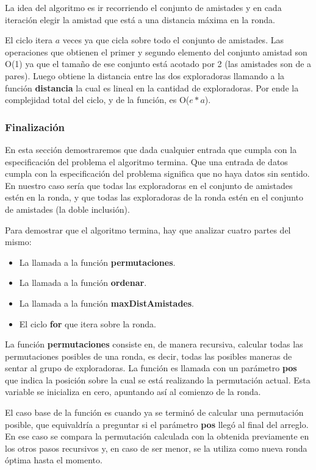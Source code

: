 \documentclass[11pt]{article}
\begin{document}
La idea del algoritmo es ir recorriendo el conjunto de amistades y en cada iteración elegir la amistad que está   
a una distancia máxima en la ronda.

El ciclo itera $a$ veces ya que cicla sobre todo el conjunto de amistades. Las operaciones que obtienen el 
primer y segundo elemento del conjunto amistad son O(1) ya que el tamaño de ese conjunto está acotado por 
2 (las amistades son de a pares). Luego obtiene la distancia entre las dos exploradoras llamando a la 
función \textbf{distancia} la cual es lineal en la cantidad de exploradoras. Por ende la complejidad
total del ciclo, y de la función, es O($e*a$). 
\subsubsection{Finalización}

En esta sección demostraremos que dada cualquier entrada que cumpla con la especificación del problema el 
algoritmo termina. Que una entrada de datos cumpla con la especificación del problema significa que no haya
datos sin sentido. En nuestro caso sería que todas las exploradoras en el conjunto de amistades estén en la  
ronda, y que todas las exploradoras de la ronda estén en el conjunto de amistades (la doble inclusión).

Para demostrar que el algoritmo termina, hay que analizar cuatro partes del mismo:
\begin{itemize}
  \item La llamada a la función \textbf{permutaciones}.
  \item La llamada a la función \textbf{ordenar}.
  \item La llamada a la función \textbf{maxDistAmistades}.
  \item El ciclo \textbf{for} que itera sobre la ronda.
\end{itemize}

La función \textbf{permutaciones} consiste en, de manera recursiva, calcular todas las permutaciones posibles 
de una ronda, es decir, todas las posibles maneras de sentar al grupo de exploradoras.
La función es llamada con un parámetro \textbf{pos} que indica la posición sobre la cual se está realizando 
la permutación actual. Esta variable se inicializa en cero, apuntando así al comienzo de la ronda.

El caso base de la función es cuando ya se terminó de calcular una permutación posible, que equivaldría a 
preguntar si el parámetro \textbf{pos} llegó al final del arreglo. En ese caso se compara la 
permutación calculada con la obtenida previamente en los otros pasos recursivos y, en caso de ser menor, se 
la utiliza como nueva ronda óptima hasta el momento.
\end{document}
